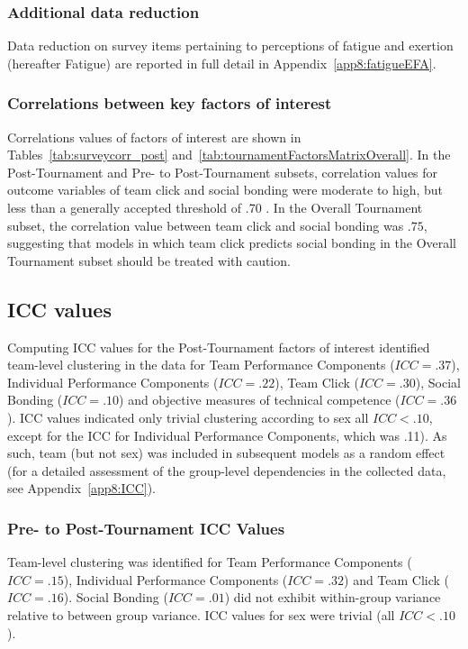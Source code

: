 \begin{CJK}{UTF8}{gbsn}
\subsubsection{Additional data reduction}
Data reduction on survey items pertaining to perceptions of fatigue and exertion (hereafter Fatigue) are reported in full detail in Appendix~\ref{app8:fatigueEFA}.


\subsubsection{Correlations between key factors of interest}
Correlations values of factors of interest are shown in Tables~\ref{tab:surveycorr_post} and~\ref{tab:tournamentFactorsMatrixOverall}.  In the Post-Tournament and Pre- to Post-Tournament subsets, correlation values for outcome variables of team click and social bonding were moderate to high, but less than a generally accepted threshold of .70 \citep{Field2012}.  In the Overall Tournament subset, the correlation value between team click and social bonding was $.75$, suggesting that models in which team click predicts social bonding in the Overall Tournament subset should be treated with caution.








\subsection{ICC values}

Computing ICC values for the Post-Tournament factors of interest identified team-level clustering in the data for Team Performance Components ($ICC = .37$), Individual Performance Components ($ICC = .22$), Team Click ($ICC = .30$), Social Bonding ($ICC = .10$) and objective measures of technical competence ($ICC = .36$).  ICC values indicated only trivial clustering according to sex all $ICC < .10$, except for the ICC for Individual Performance Components, which was .11).  As such, team (but not sex) was included in subsequent models as a random effect (for a detailed assessment of the group-level dependencies in the collected data, see Appendix~\ref{app8:ICC}).


\subsubsection{Pre- to Post-Tournament ICC Values}
Team-level clustering was identified for
Team Performance Components ($ICC = .15$), Individual Performance Components ($ICC = .32$) and Team Click ($ICC = .16$).  Social Bonding ($ICC = .01$) did not exhibit within-group variance relative to between group variance. ICC values for sex were trivial (all $ICC < .10$).


\end{CJK}
